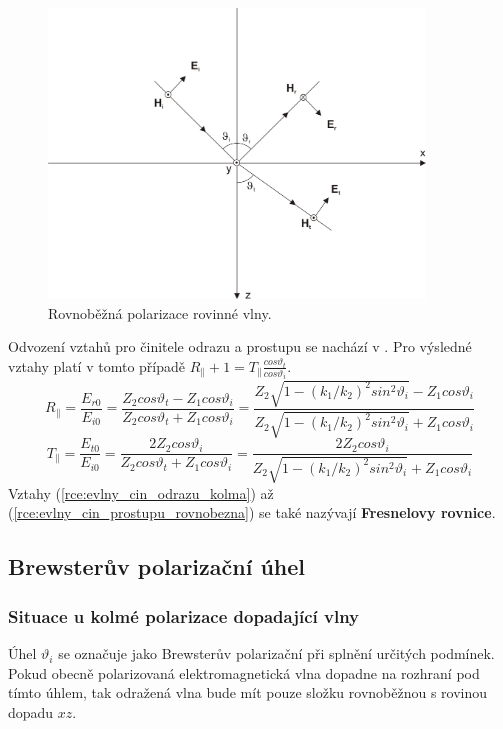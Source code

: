 \begin{figure}[!h]
	\centering
	\includegraphics[width=10cm]{evlny_rovnobezna_polarizace.png}
	\caption{Rovnoběžná polarizace rovinné vlny.\cite{emp}}
	\label{obr:evlny_rovnobezna_polarizace}
\end{figure}

Odvození vztahů pro činitele odrazu a prostupu se nachází v \cite[str. 95]{emp}. Pro výsledné vztahy platí v tomto případě $R_{\parallel} + 1 = T_{\parallel}\frac{cos\vartheta_{t}}{cos\vartheta_{i}}$.
\begin{equation}
	R_{\parallel} = \frac{E_{r0}}{E_{i0}} = \frac{Z_{2}cos\vartheta_{t}-Z_{1}cos\vartheta_{i}}{Z_{2}cos\vartheta_{t}+Z_{1}cos\vartheta_{i}} = \frac{Z_{2}\sqrt{1-(k_{1}/k_{2})^{2}sin^{2}\vartheta_{i}}-Z_{1}cos\vartheta_{i}}{Z_{2}\sqrt{1-(k_{1}/k_{2})^{2}sin^{2}\vartheta_{i}}+Z_{1}cos\vartheta_{i}}
	\label{rce:evlny_cin_odrazu_rovnobezna}
\end{equation}
\begin{equation}
	T_{\parallel} = \frac{E_{t0}}{E_{i0}} = \frac{2Z_{2}cos\vartheta_{i}}{Z_{2}cos\vartheta_{t}+Z_{1}cos\vartheta_{i}} = \frac{2Z_{2}cos\vartheta_{i}}{Z_{2}\sqrt{1-(k_{1}/k_{2})^{2}sin^{2}\vartheta_{i}}+Z_{1}cos\vartheta_{i}}
	\label{rce:evlny_cin_prostupu_rovnobezna}
\end{equation}
Vztahy (\ref{rce:evlny_cin_odrazu_kolma}) až (\ref{rce:evlny_cin_prostupu_rovnobezna}) se také nazývají {\bf Fresnelovy rovnice}.

\subsection{Brewsterův polarizační úhel}
\subsubsection*{Situace u kolmé polarizace dopadající vlny}
Úhel $\vartheta_{i}$ se označuje jako Brewsterův polarizační při splnění určitých podmínek. Pokud obecně polarizovaná elektromagnetická vlna dopadne na rozhraní pod tímto úhlem, tak odražená vlna bude mít pouze složku rovnoběžnou s rovinou dopadu $xz$.

